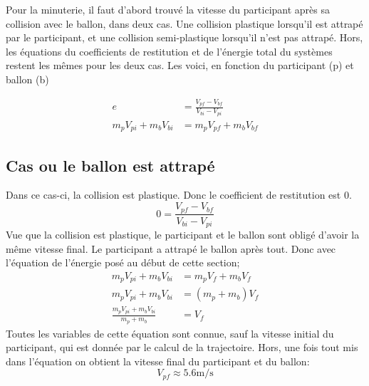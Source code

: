 Pour la minuterie, il faut d'abord trouvé la vitesse du participant après sa
collision avec le ballon, dans deux cas. Une collision plastique lorsqu'il est
attrapé par le participant, et une collision semi-plastique lorsqu'il n'est pas
attrapé. Hors, les équations du coefficients de restitution et de l'énergie
total du systèmes restent les mêmes pour les deux cas. Les voici, en fonction du
participant (p) et ballon (b)

\begin{align}
	e&=\frac{V_{pf}-V_{bf}}{V_{bi}-{V_{pi}}}\\
	m_pV_{pi}+m_bV_{bi}&=m_pV_{pf}+m_bV_{bf}
\end{align}

\subsection{Cas ou le ballon est attrapé}
Dans ce cas-ci, la collision est plastique. Donc le coefficient de restitution
est 0.
\begin{equation}
0=\frac{V_{pf}-V_{bf}}{V_{bi}-{V_{pi}}}
\end{equation}
Vue que la collision est plastique, le participant et le ballon sont obligé
d'avoir la même vitesse final. Le participant a attrapé le ballon après tout.
Donc avec l'équation de l'énergie posé au début de cette section;
\begin{align}
	m_pV_{pi}+m_bV_{bi}&=m_pV_{f}+m_bV_{f}\\
	m_pV_{pi}+m_bV_{bi}&=(m_p+m_b)V_{f}\\
	\frac{m_pV_{pi}+m_bV_{bi}}{m_p+m_b}&=V_{f}
\end{align}
Toutes les variables de cette équation sont connue, sauf la vitesse initial du participant, qui est donnée par le calcul de la trajectoire. Hors, une fois tout mis dans l'équation on obtient la vitesse final du participant et du ballon:
\begin{equation}
V_{pf}\approx5.6\text{m/s}
\end{equation}

